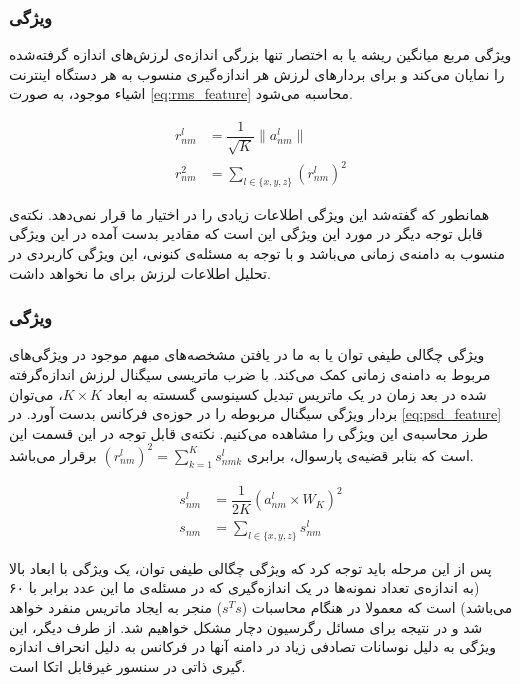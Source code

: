 \subsubsection{ویژگی }
ویژگی مربع میانگین ریشه یا به اختصار  تنها بزرگی اندازه‌ی لرزش‌های اندازه‌ گرفته‌شده را نمایان می‌کند و برای بردارهای لرزش هر اندازه‌گیری منسوب به هر دستگاه اینترنت اشیاء موجود، به صورت \cref{eq:rms_feature} محاسبه می‌شود.

\begin{equation}
\label{eq:rms_feature}
\begin{split} 
r^l_{nm} & = \dfrac{1}{\sqrt{K}}\|a^l_{nm}\|\\
r^2_{nm} &  = \sum_{l \in \{x, y, z\}} (r^l_{nm})^2
\end{split} 
\end{equation}

همانطور که گفته‌شد این ویژگی اطلاعات زیادی را در اختیار ما قرار نمی‌دهد. نکته‌ی قابل توجه دیگر در مورد این ویژگی این است که مقادیر بدست آمده در این ویژگی منسوب به دامنه‌ی زمانی می‌باشد و با توجه به مسئله‌ی کنونی، این ویژگی کاربردی در تحلیل اطلاعات لرزش برای ما نخواهد داشت.


\subsubsection{ویژگی }
ویژگی چگالی طیفی توان یا  به ما در یافتن مشخصه‌های مبهم موجود در ویژگی‌های مربوط به دامنه‌ی زمانی کمک می‌کند. با ضرب ماتریسی سیگنال لرزش اندازه‌گرفته شده در بعد زمان در یک ماتریس تبدیل کسینوسی گسسته به ابعاد $K \times K$، می‌توان بردار ویژگی سیگنال مربوطه را در حوزه‌ی فرکانس بدست آورد. در \cref{eq:psd_feature} طرز محاسبه‌ی این ویژگی را مشاهده می‌کنیم. نکته‌ی قابل توجه در این قسمت این است که بنابر قضیه‌ی پارسوال، برابری $(r^l_{nm})^2 = \sum_{k = 1}^{K}s^l_{nmk}$ برقرار می‌باشد.

\begin{equation}
\label{eq:psd_feature}
\begin{split} 
s^l_{nm} & = \dfrac{1}{2K}(a^l_{nm} \times W_K)^2\\
s_{nm} &  = \sum_{l \in \{x, y, z\}} s^l_{nm}
\end{split} 
\end{equation}

 پس از این مرحله باید توجه کرد که ویژگی چگالی طیفی توان، یک ویژگی با ابعاد بالا (به اندازه‌ی تعداد نمونه‌ها در یک اندازه‌گیری که در مسئله‌ی ما این عدد برابر با ۶۰ می‌باشد) است که معمولا در هنگام محاسبات ($s^Ts$) منجر به ایجاد ماتریس منفرد خواهد شد و در نتیجه برای مسائل رگرسیون دچار مشکل خواهیم شد. از طرف دیگر، این ویژگی به دلیل نوسانات تصادفی زیاد در دامنه آنها در فرکانس به دلیل انحراف اندازه گیری ذاتی در سنسور  غیرقابل اتکا است.
 
